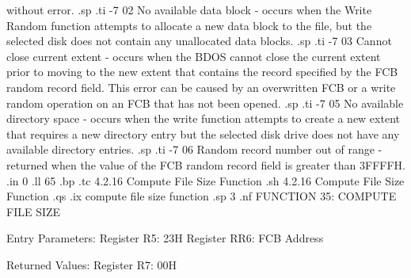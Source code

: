 without error.
.sp
.ti -7
02     No available data block - occurs when
the Write Random function attempts to allocate a new data block to the
file, but the selected disk does not contain any unallocated data blocks.
.sp
.ti -7
03     Cannot close current extent - occurs when the BDOS cannot
close the current extent prior to moving to the new extent that
contains the record specified by the FCB random record field. 
This error can be caused by an overwritten FCB or a write random
operation on an FCB that has not been opened. 
.sp
.ti -7
05     No available directory space - occurs when
the write function attempts to create a new extent that requires a
new directory entry but the selected disk drive does not have any 
available directory entries. 
.sp
.ti -7
06     Random record number out of range -  returned when 
the value of the FCB random record field is greater than 3FFFFH.
.in 0
.ll 65
.bp
.tc         4.2.16 Compute File Size Function
.sh
4.2.16 Compute File Size Function
.qs
.ix compute file size function
.sp 3
.nf
                 FUNCTION 35:  COMPUTE FILE SIZE

         Entry Parameters:
            Register   R5:  23H
            Register  RR6:  FCB Address

         Returned  Values:
            Register   R7:  00H

